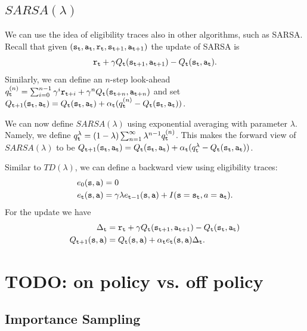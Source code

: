 \subsection{$SARSA(\lambda)$}

We can use the idea of eligibility traces also in other algorithms,
such as SARSA. Recall that given
$({\tt s}_{\tt t},{\tt a}_{\tt t},{\tt r}_{\tt t},{\tt s}_{{\tt t}+1},{\tt a}_{{\tt t}+1})$
the update of SARSA is
\[
{\tt r}_{\tt t}+\gamma
Q_{\tt t}({\tt s}_{{\tt t}+1},{\tt a}_{{\tt t}+1})-Q_{\tt t}({\tt s}_{\tt t},{\tt a}_{\tt t}).
\]
Similarly, we can define an $n$-step look-ahead
$q^{(n)}_{\tt t}=\sum_{i=0}^{n-1}\gamma^i {\tt r}_{{\tt t}+i}
+\gamma^n Q_{\tt t}({\tt s}_{{\tt t}+n},{\tt a}_{{\tt t}+n})$ and set
$Q_{{\tt t}+1}({\tt s}_{\tt t},{\tt a}_{\tt t})=Q_{\tt t}({\tt s}_{\tt t},{\tt a}_{\tt t})+\alpha_{\tt t}
(q^{(n)}_{\tt t}-Q_{\tt t}({\tt s}_{\tt t},{\tt a}_{\tt t}))$.

We can now define $SARSA(\lambda)$ using exponential averaging with
parameter $\lambda$. Namely, we define
$q^\lambda_{\tt t}=(1-\lambda)\sum_{n=1}^\infty
\lambda^{n-1}q^{(n)}_{{\tt t}}$. This makes the forward view of
$SARSA(\lambda)$ to be
$Q_{{\tt t}+1}({\tt s}_{\tt t},{\tt a}_{\tt t})=Q_{\tt t}({\tt s}_{\tt t},{\tt a}_{\tt t})+\alpha_{\tt t}
(q^{\lambda}_{\tt t}-Q_{\tt t}({\tt s}_{\tt t},{\tt a}_{\tt t}))$.


Similar to $TD(\lambda)$, we can define a backward view using
eligibility traces:
\begin{align*}
e_0({\tt s},{\tt a})&=0\\
e_{\tt t}({\tt s},{\tt a})&=\gamma\lambda
e_{{\tt t}-1}({\tt s},{\tt a})+ I({\tt s}={\tt s}_{\tt t},
a={\tt a}_{\tt t}).
\end{align*}
For the update we have
\begin{align*}
\Delta_{\tt t}&= {\tt r}_{\tt t} +\gamma Q_{\tt t}({\tt s}_{{\tt t}+1},{\tt a}_{{\tt t}+1})-Q_{\tt t}({\tt s}_{\tt t},{\tt a}_{\tt t})\\
Q_{{\tt t}+1}({\tt s},{\tt a})&=Q_{{\tt t}}({\tt s},{\tt a})+\alpha_{\tt t}
e_{\tt t}({\tt s},{\tt a})\Delta_{\tt t}.
\end{align*}

\section{TODO: on policy vs. off policy}

\subsection{Importance Sampling}

